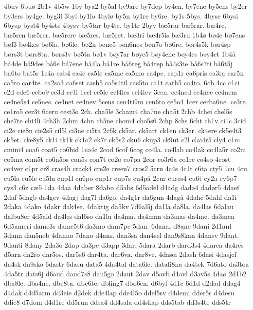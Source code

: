 4buv
6bu^^f8
2b1v
4b5w
1by
bya2
by5al
by9are
by7dep
by4en.
by7ene
by5ens
by2er
by3ers
by4ge.
byg3l
3byi
by1lo
4byl^^f8
by5n
by1re
by6re.
by1s
5bys.
4byse
6bysi
6bysp
byst4
by4ste
4bysv
by5tar
by4te.
by1tr
2byv
b^^e65rar
b^^e66rar.
b^^e64re.
b^^e65ren
b^^e65rer.
b^^e65rere
b^^e65res.
b^^e65ret.
b^^e63ri
b^^e64r5is
b^^e63ru
1b4^^f8
b^^f84e
b^^f87ens
b^^f8f3
b^^f84kes
b^^f86la.
b^^f86le.
b^^f82n
b^^f8ne5
b^^f8n6nes
b^^f8n7o
b^^f86re.
b^^f8r4s5k
b^^f8r4sp
b^^f8rs3t
b^^f8rs8ta.
b^^f8rs3v
b^^f85ta
b^^f81v
b^^f8y7ar
b^^f8ye5
b^^f8y4ene
b^^f8y4es
b^^f8y4et
1b4^^e5
b^^e54de
b^^e59des
b^^e56e
b^^e57ene
b^^e54la
b^^e51re
b^^e56reg
b^^e54rep
b^^e54s3te
b^^e56s7ti
b^^e56t5j
b^^e56to
b^^e5t5r
1c4a
cab4
ca4e
ca5le
ca5me
ca5mo
ca4pe.
cap1r
ca6pris
ca3ra
car5n
ca5ro
car4te.
ca2sa3
ca6set
cash5
ca5s4til
cas5to
ca1t
cath5
ca4to.
6cb
4cc
c1ci
c2d
cde6
cebo9
ce3d
ce1i
1cel
ce5le
cel4les
cel4lev
3cen.
ce4ned
ce4nee
ce4nem
ce4ne5s4
ce5nes.
ce4net
ce4nev
5cens
cen4ti9m
cen6to
ce5o4
1cer
cerba6ne.
ce3re
ce1ro5
cer3t
6ceru
cest3o
2ch.
cha5le
3cham4
cha7ne
cha5t
2chb
4chei
chel5s
che7te
chi4li
4ch3h
2chm
4chn
ch5ne
chom4
cho5s6
2chp
8chs
6cht
ch1v
ci1c
3cid
ci2e
cie8n
cie2s5
cil5l
ci3ne
ci5ta
2c6k
ck5ar.
ck5art
ck1en
ck3er.
ck4ere
ck5e4t3
ck5et.
cke8y5
ck1i
ck1k
ck1o2
ck7r
ck5s2
cku6
ckup3
ck9ut
c2l
clai4r5
cly4
c1m
cmini4
coa6
coat5
co6bid
1co4c
2cod
6cof
6cog
co4la.
co4lab
co4lak
co4la5r
co2m
co5ma
com5t
co6n5os
con5s
con7t
co2o
co7pa
2cor
co3r6a
co1re
co4so
4cost
co4ver
c1pr
cr8
cras4h
crack4
cre2e
creen7
cros2
5cru
4c4s
4c1t
c6ta
cty5
1cu
4cu.
cu5la
cu5le
cu5lu
cup1l
cu6po
cup1r
cup7s
cu4p^^e5
2cur
cures4
cu6t
cy2a
cy6p7
cys3
c6z
c^^e65
1da
4daa
4daber
8dabo
d5abs
6d5adel
d4adg
dad^^f84
dad^^f8r5
4daef
2daf
5dagb
da4gev
4dagj
dag7l
da6go.
da4g1r
da6gun
4dag^^e5
4dahe
5dahl
da1i
2daka
4dako
4dakr
dak4se.
4daktig
da5kv
7d6al5j
da1la
da8la.
da4las
6dalau
dalbu8er
4d5ald
da4les
dal6so
da1lu
da4ma.
da4man
da3mas
da4me.
da3men
6d5ameri
dame3s
dame5t6
da3mo
dam7pe
5dan.
6danal
d8ane
9dani
2d1anl
3dann
dan5neb
4danno
7dano
d4ans.
dan3sa
dan4sel
dan9s8kan
4dansv
9dant.
9danti
8dany
2da3o
2dap
da3pe
d3app
3dar.
5dara
2darb
dard3s4
4darea
da4res
d5arn
da2ro
dar5os.
dar5s6
dar4ta.
dar6va.
dar8ve.
4dasei
2dash
6dasi
4dasjef
da4sk
da9sko
6dastr
6dasu
data5
4da4tal
data6le.
datali8na
da4tek
7d6ato
da3toa
4da5tr
dats6j
d6aud
daud7s8
dau5go
2daut
2dav
d5avb
d1avl
d3av5s
4da^^f8
2d1b2
dba8le.
dba4ne.
dbe8ta.
dbe6te.
dbling7
dbo6en.
d6byf
4d1c
6d1d
d2dad
ddag4
d4dak
d4d5arm
dd3eie
d2dek
dde4lap
dde4l5o
ddel5sv
d4demi
dder5s
d4desu
ddie8
d7dom
d4d1re
dd5run
ddsa4
dd4sala
dd4skap
dds5tab
dd3s4te
dds5tr
